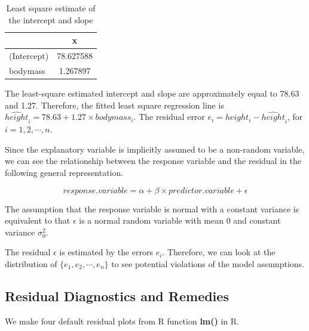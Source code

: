 \documentclass[
]{book}
\begin{document}
\begin{table}

\caption{\label{tab:unnamed-chunk-141}Least square estimate of the intercept and slope}
\centering
\begin{tabular}[t]{l|c}
\hline
  & x\\
\hline
(Intercept) & 78.627588\\
\hline
bodymass & 1.267897\\
\hline
\end{tabular}
\end{table}

The least-square estimated intercept and slope are approximately equal to 78.63 and 1.27. Therefore, the fitted least square regression line is \(\widehat{height}_i = 78.63 + 1.27\times bodymass_i\). The residual error \(e_i=height_i - \widehat{height}_i\), for \(i=1, 2, \cdots, n.\)

Since the explanatory variable is implicitly assumed to be a non-random variable, we can see the relationship between the response variable and the residual in the following general representation.

\[
response.variable = \alpha + \beta \times predictor.variable + \epsilon
\]

The assumption that the response variable is normal with a constant variance is equivalent to that \(\epsilon\) is a normal random variable with mean 0 and constant variance \(\sigma_0^2\).

The residual \(\epsilon\) is estimated by the errors \(e_i\). Therefore, we can look at the distribution of \(\{e_1, e_2, \cdots, e_n\}\) to see potential violations of the model assumptions.

\hypertarget{residual-diagnostics-and-remedies}{%
\subsection{Residual Diagnostics and Remedies}\label{residual-diagnostics-and-remedies}}

We make four default residual plots from R function \textbf{lm()} in R.
\end{document}
